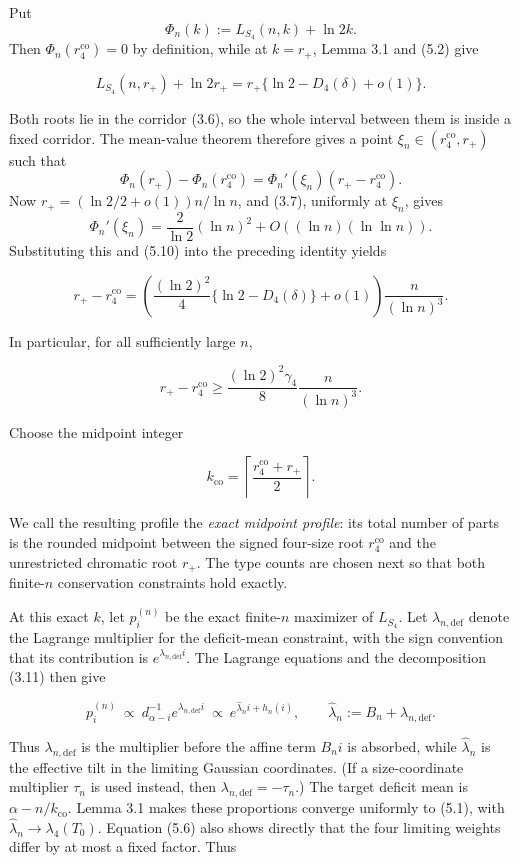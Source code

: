 \documentclass[11pt,reqno]{amsart}
\begin{document}
Put
\[
 \Phi_n(k):=L_{S_4}(n,k)+{\ln 2}k.
\]
Then \(\Phi_n(r_4^{\mathrm{co}})=0\) by definition, while at
\(k=r_+\), Lemma 3.1 and (5.2) give

\[
 L_{S_4}(n,r_+)+{\ln 2}r_+
 =r_+\{{\ln 2}-D_4(\delta)+o(1)\}.                             \tag{5.10}
\]

Both roots lie in the corridor (3.6), so the whole interval between them
is inside a fixed corridor.  The mean-value theorem therefore gives a
point \(\xi_n\in(r_4^{\mathrm{co}},r_+)\) such that
\[
 \Phi_n(r_+)-\Phi_n(r_4^{\mathrm{co}})
 =\Phi_n'(\xi_n)(r_+-r_4^{\mathrm{co}}).
\]
Now \(r_+=({\ln 2}/2+o(1))n/{\ln n}\), and (3.7), uniformly at
\(\xi_n\), gives
\[
 \Phi_n'(\xi_n)=\frac2{\ln 2}(\ln n)^2
                 +O((\ln n)(\ln\ln n)).
\]
Substituting this and (5.10) into the preceding identity yields

\[
 r_+-r_4^{\mathrm{co}}
 =\left(\frac{(\ln 2)^2}{4}\{{\ln 2}-D_4(\delta)\}+o(1)\right)
   \frac n{(\ln n)^3}.                                        \tag{5.11}
\]

In particular, for all sufficiently large \(n\),

\[
 r_+-r_4^{\mathrm{co}}\ge\frac{(\ln 2)^2\gamma_4}{8}\frac n{(\ln n)^3}.     \tag{5.12}
\]

Choose the midpoint integer

\[
 k_{\mathrm{co}}=\left\lceil\frac{r_4^{\mathrm{co}}+r_+}{2}\right\rceil. \tag{5.13}
\]

We call the resulting profile the \emph{exact midpoint profile}: its total
number of parts is the rounded midpoint between the signed four-size root
\(r_4^{\mathrm{co}}\) and the unrestricted chromatic root \(r_+\).  The
type counts are chosen next so that both finite-\(n\) conservation
constraints hold exactly.

At this exact \(k\), let \(p_i^{(n)}\) be the exact
finite-\(n\) maximizer of \(L_{S_4}\).  Let
\(\lambda_{n,\mathrm{def}}\) denote the Lagrange multiplier for the
deficit-mean constraint, with the sign convention that its contribution
is \(e^{\lambda_{n,\mathrm{def}}i}\).  The Lagrange equations and the
decomposition (3.11) then give

\[
 p_i^{(n)}\ \propto\ d_{\alpha-i}^{-1}e^{\lambda_{n,\mathrm{def}}i}
 \ \propto\ e^{\widehat\lambda_ni+h_n(i)},\qquad
 \widehat\lambda_n:=B_n+\lambda_{n,\mathrm{def}}.          \tag{5.14}
\]

Thus \(\lambda_{n,\mathrm{def}}\) is the multiplier before the affine
term \(B_ni\) is absorbed, while \(\widehat\lambda_n\) is the effective
tilt in the limiting Gaussian coordinates.  (If a size-coordinate
multiplier \(\tau_n\) is used instead, then
\(\lambda_{n,\mathrm{def}}=-\tau_n\).)
The target deficit mean is \(\alpha-n/k_{\mathrm{co}}\). Lemma 3.1 makes these proportions
converge uniformly to (5.1), with
\(\widehat\lambda_n\to\lambda_4(T_0)\). Equation (5.6) also shows
directly that the four limiting weights differ by at most a fixed
factor. Thus
\end{document}
